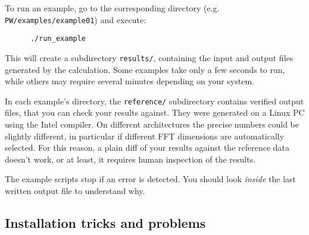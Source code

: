\documentclass[12pt,a4paper]{article}
\begin{document}
To run an example, go to the corresponding directory (e.g.
 \texttt{PW/examples/example01}) and execute: 
\begin{verbatim}
      ./run_example
\end{verbatim}
This will create a subdirectory \texttt{results/}, containing the input and
output files generated by the calculation. Some examples take only a
few seconds to run, while others may require several minutes depending
on your system.

In each example's directory, the \texttt{reference/} subdirectory contains
verified output files, that you can check your results against. They
were generated on a Linux PC using the Intel compiler. On different
architectures the precise numbers could be slightly different, in
particular if different FFT dimensions are automatically selected. For
this reason, a plain diff of your results against the reference data
doesn't work, or at least, it requires human inspection of the results. 

The example scripts stop if an error is detected. You should look {\em inside}
the last written output file to understand why.

\subsection{Installation tricks and problems}
\end{document}
